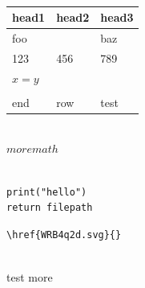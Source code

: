 \documentclass[11pt]{article}
\begin{document}
\\
\begin{tabular} { |l|l|l| } \hline
 head1   & head2 & head3 

\\ \hline foo     &       & baz   
\\ \hline 123     & 456   & 789   
\\ \hline \(x=y\) &       &       
\\ \hline         &       &       
\\ \hline end     & row   & test  \\ \hline\end{tabular}
\\
\( more math \)
\\

\\
\begin{lstlisting}print("hello")
return filepath
\end{lstlisting}

\begin{lstlisting}\href{WRB4q2d.svg}{}\end{lstlisting}
\\
test more
\end{document}
